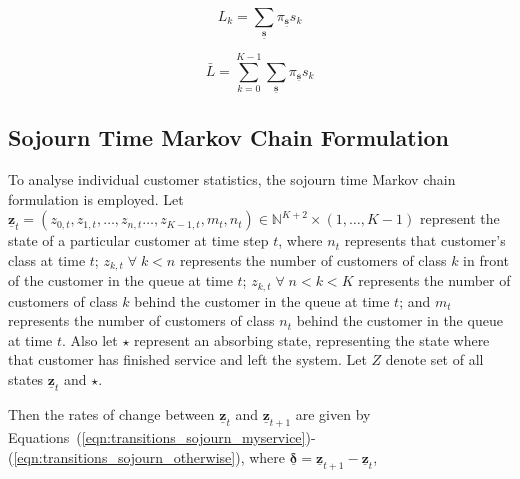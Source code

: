 \documentclass{article}
\begin{document}
\begin{equation}\label{eqn:mean_custs_k}
L_k = \sum_{\underline{\mathbf{s}}} \pi_{\underline{\mathbf{s}}} s_k
\end{equation}

\begin{equation}\label{eqn:mean_custs_overall}
\bar{L} = \sum_{k = 0}^{K - 1} \sum_{\underline{\mathbf{s}}} \pi_{\underline{\mathbf{s}}} s_k
\end{equation}



\subsection{Sojourn Time Markov Chain Formulation}\label{sec:sojourn_formulation}
To analyse individual customer statistics, the sojourn time Markov chain
formulation is employed. Let
$\underline{\mathbf{z}}_t = (z_{0,t}, z_{1,t}, \dots, z_{n,t} \dots, z_{K-1,t}, m_t, n_t) \in \mathbb{N}^{K+2} \times (1, \dots, K - 1)$
represent the state of a particular customer at time step $t$, where $n_t$
represents that customer's class at time $t$; $z_{k,t} \; \forall \; k < n$
represents the number of customers of class $k$ in front of the customer in the
queue at time $t$; $z_{k,t} \; \forall \; n < k < K$ represents the number of
customers of class $k$ behind the customer in the queue at time $t$; and $m_t$
represents the number of customers of class $n_t$ behind the customer in the
queue at time $t$.
Also let $\star$ represent an absorbing state, representing the state where that
customer has finished service and left the system.
Let $Z$ denote set of all states $\underline{\mathbf{z}}_t$ and $\star$. 


Then the rates of change between $\underline{\mathbf{z}}_t$ and
$\underline{\mathbf{z}}_{t+1}$ are given by
Equations~(\ref{eqn:transitions_sojourn_myservice})-(\ref{eqn:transitions_sojourn_otherwise}),
where $\underline{\mathbf{\delta}} = \underline{\mathbf{z}}_{t+1} - \underline{\mathbf{z}}_t$,
\end{document}
